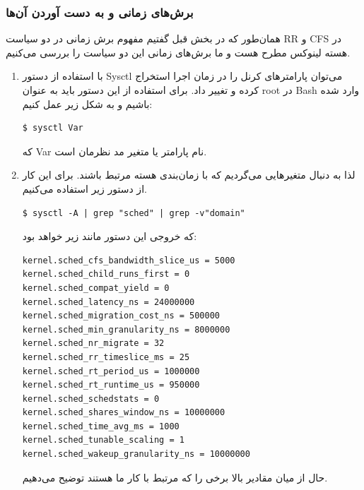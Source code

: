 \documentclass{article}
\begin{document}
\subsubsection{برش‌های زمانی و به دست‌ آوردن آن‌ها\cite{3}\cite{4}}

همان‌طور که در بخش قبل گفتیم مفهوم برش زمانی در دو سیاست RR و CFS در هسته لینوکس مطرح هست و ما برش‌های زمانی این دو سیاست را بررسی می‌کنیم.

\begin{enumerate}

\item با استفاده از دستور Sysctl می‌توان پارامتر‌های کرنل را در زمان اجرا استخراج کرده و تغییر داد. برای استفاده از این دستور باید به عنوان root در Bash وارد شده باشیم و به شکل زیر عمل کنیم:

\begin{latin}
\begin{verbatim}
$ sysctl Var
\end{verbatim}
\end{latin}

که Var نام پارامتر یا متغیر مد نظرمان است.

\item لذا به دنبال متغیر‌هایی می‌گردیم که با زمان‌بندی هسته مرتبط باشند. برای این کار از دستور زیر استفاده می‌کنیم.

\begin{latin}
\begin{verbatim}
$ sysctl -A | grep "sched" | grep -v"domain"
\end{verbatim}
\end{latin}

که خروجی این دستور مانند زیر خواهد بود:

\begin{latin}
\begin{verbatim}
kernel.sched_cfs_bandwidth_slice_us = 5000
kernel.sched_child_runs_first = 0
kernel.sched_compat_yield = 0
kernel.sched_latency_ns = 24000000
kernel.sched_migration_cost_ns = 500000
kernel.sched_min_granularity_ns = 8000000
kernel.sched_nr_migrate = 32
kernel.sched_rr_timeslice_ms = 25
kernel.sched_rt_period_us = 1000000
kernel.sched_rt_runtime_us = 950000
kernel.sched_schedstats = 0
kernel.sched_shares_window_ns = 10000000
kernel.sched_time_avg_ms = 1000
kernel.sched_tunable_scaling = 1
kernel.sched_wakeup_granularity_ns = 10000000
\end{verbatim}
\end{latin}

حال از میان مقادیر بالا برخی را که مرتبط با کار ما هستند توضیح می‌دهیم.


\end{enumerate}
\end{document}

